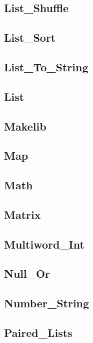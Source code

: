 \subsection{List\_Shuffle}				
\subsection{List\_Sort}					
\subsection{List\_To\_String}				
\subsection{List}					
\subsection{Makelib}                                    
\subsection{Map}					
\subsection{Math}					
\subsection{Matrix}					
\subsection{Multiword\_Int}				
\subsection{Null\_Or}                                   
\subsection{Number\_String}				
\subsection{Paired\_Lists}				
